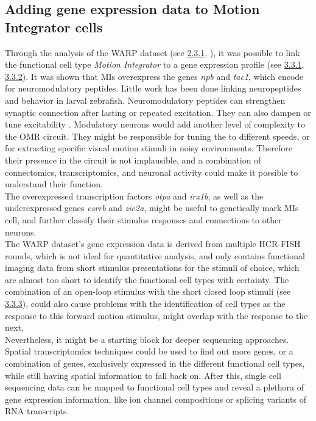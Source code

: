 \documentclass[12pt, a4paper, oneside]{article}
\begin{document}
\subsection{Adding gene expression data to Motion Integrator cells}
Through the analysis of the WARP dataset (see \hyperref[sec:warp met]{2.3.1}, \cite{marquez-legorretaWholeBrainCoMappingGene2026}), it was possible to link the functional cell type \textit{Motion Integrator} to a gene expression profile (see \hyperref[sec:warp detect mi]{3.3.1}, \hyperref[sec:warp mi genes]{3.3.2}).
It was shown that MIs overexpress the genes \textit{npb} and \textit{tac1}, which encode for neuromodulatory peptides.  Little work has been done linking neuropeptides and behavior in larval zebrafish. Neuromodulatory peptides can strengthen synaptic connection after lasting or repeated excitation. They can also dampen or tune excitability \parencite{nusbaumFunctionalConsequencesNeuropeptide2017}.
Modulatory neurons would add another level of complexity to the OMR circuit. They might be responsible for tuning the to different speeds, or for extracting specific visual motion stimuli in noisy environments. Therefore their presence in the circuit is not implausible, and a combination of connectomics, transcriptomics, and neuronal activity could make it possible to understand their function.\\
The overexpressed transcription factors \textit{otpa} and \textit{irx1b}, as well as the underexpressed genes \textit{esrrb} and \textit{zic2a}, might be useful to genetically mark MIs cell, and further classify their stimulus responses and connections to other neurons.\\
The WARP dataset's gene expression data is derived from multiple HCR-FISH rounds, which is not ideal for quantitative analysis, and only contains functional imaging data from short stimulus presentations for the stimuli of choice, which are almost too short to identify the functional cell types with certainty. The combination of an open-loop stimulus with the short closed loop stimuli (see \hyperref[sec:link gene]{3.3.3}), could also cause problems with the identification of cell types as the response to this forward motion stimulus, might overlap with the response to the next.\\
Nevertheless, it might be a starting block for deeper sequencing approaches. Spatial transcriptomics techniques could be used to find out more genes, or a combination of genes, exclusively expressed in the different functional cell types, while still having spatial information to fall back on. After this, single cell sequencing data can be mapped to functional cell types and reveal a plethora of gene expression information, like ion channel compositions or splicing variants of RNA transcripts.\\
\end{document}

